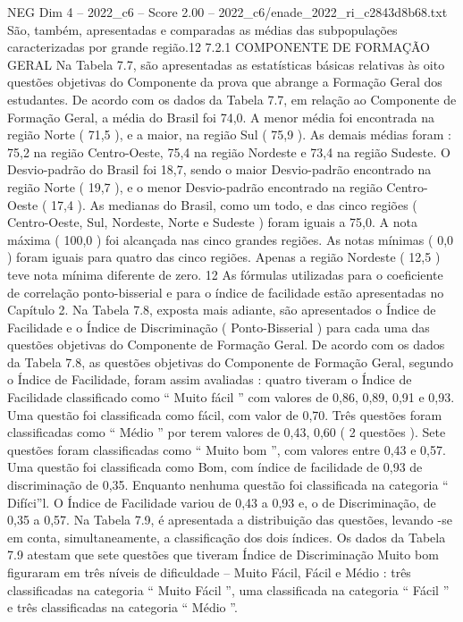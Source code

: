 \begin{textsample}{NEG Dim 4 – 2022\_c6 – Score 2.00 – 2022\_c6/enade\_2022\_ri\_c2843d8b68.txt}
São, também, apresentadas e comparadas as médias das subpopulações caracterizadas por grande região.12 7.2.1 COMPONENTE DE FORMAÇÃO GERAL Na Tabela 7.7, são apresentadas as estatísticas básicas relativas às oito questões objetivas do Componente da prova que abrange a Formação Geral dos estudantes.
De acordo com os dados da Tabela 7.7, em relação ao Componente de Formação Geral, a média do Brasil foi 74,0.
A menor média foi encontrada na região Norte ( 71,5 ), e a maior, na região Sul ( 75,9 ).
As demais médias foram : 75,2 na região Centro-Oeste, 75,4 na região Nordeste e 73,4 na região Sudeste.
O Desvio-padrão do Brasil foi 18,7, sendo o maior Desvio-padrão encontrado na região Norte ( 19,7 ), e o menor Desvio-padrão encontrado na região Centro-Oeste ( 17,4 ).
As medianas do Brasil, como um todo, e das cinco regiões ( Centro-Oeste, Sul, Nordeste, Norte e Sudeste ) foram iguais a 75,0.
A nota máxima ( 100,0 ) foi alcançada nas cinco grandes regiões.
As notas mínimas ( 0,0 ) foram iguais para quatro das cinco regiões.
Apenas a região Nordeste ( 12,5 ) teve nota mínima diferente de zero. 12 As fórmulas utilizadas para o coeficiente de correlação ponto-bisserial e para o índice de facilidade estão apresentadas no Capítulo 2.
Na Tabela 7.8, exposta mais adiante, são apresentados o Índice de Facilidade e o Índice de Discriminação ( Ponto-Bisserial ) para cada uma das questões objetivas do Componente de Formação Geral.
De acordo com os dados da Tabela 7.8, as questões objetivas do Componente de Formação Geral, segundo o Índice de Facilidade, foram assim avaliadas : quatro tiveram o Índice de Facilidade classificado como “ Muito fácil ” com valores de 0,86, 0,89, 0,91 e 0,93.
Uma questão foi classificada como fácil, com valor de 0,70.
Três questões foram classificadas como “ Médio ” por terem valores de 0,43, 0,60 ( 2 questões ).
Sete questões foram classificadas como “ Muito bom ”, com valores entre 0,43 e 0,57.
Uma questão foi classificada como Bom, com índice de facilidade de 0,93 de discriminação de 0,35.
Enquanto nenhuma questão foi classificada na categoria “ Difíci”l.
O Índice de Facilidade variou de 0,43 a 0,93 e, o de Discriminação, de 0,35 a 0,57.
Na Tabela 7.9, é apresentada a distribuição das questões, levando -se em conta, simultaneamente, a classificação dos dois índices.
Os dados da Tabela 7.9 atestam que sete questões que tiveram Índice de Discriminação Muito bom figuraram em três níveis de dificuldade – Muito Fácil, Fácil e Médio : três classificadas na categoria “ Muito Fácil ”, uma classificada na categoria “ Fácil ” e três classificadas na categoria “ Médio ”.

\end{textsample}
